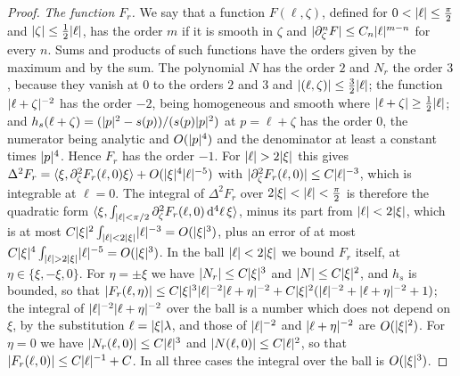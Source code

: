 \documentclass[11pt]{preprint}
\newcommand{\dd}{\mathrm{d}}
\DeclarePairedDelimiter{\abs}{\lvert}{\rvert}
\numberwithin{equation}{section}
\theoremstyle{definition}
\theoremstyle{remark}
\theoremstyle{plain}
\begin{document}
\begin{proof}
\emph{The function $F_r$.} We say that a function $F(\ell, \zeta)$, defined for $0 < \abs\ell \leq \frac\pi2$ and $\abs\zeta \leq \frac12\abs\ell$, has the order $m$ if it is smooth in $\zeta$ and $\abs{\partial_\zeta^nF} \leq C_n\abs\ell^{m-n}$ for every $n$. Sums and products of such functions have the orders given by the maximum and by the sum. The polynomial $N$ has the order $2$ and $N_r$ the order $3$, because they vanish at $0$ to the orders $2$ and $3$ and $\abs{(\ell, \zeta)} \leq \frac32\abs\ell$; the function $\abs{\ell + \zeta}^{-2}$ has the order $-2$, being homogeneous and smooth where $\abs{\ell + \zeta} \geq \frac12\abs\ell$; and $h_s(\ell + \zeta) = (\abs p^2 - s(p))/(s(p)\abs p^2)$ at $p = \ell + \zeta$ has the order $0$, the numerator being analytic and $O(\abs p^4)$ and the denominator at least a constant times $\abs p^4$. Hence $F_r$ has the order $-1$. For $\abs\ell > 2\abs\xi$ this gives $\Delta^2F_r = \langle\xi, \partial_\zeta^2F_r(\ell, 0)\xi\rangle + O(\abs\xi^4\abs\ell^{-5})$ with $\abs{\partial_\zeta^2F_r(\ell, 0)} \leq C\abs\ell^{-3}$, which is integrable at $\ell = 0$. The integral of $\Delta^2F_r$ over $2\abs\xi < \abs\ell < \frac\pi2$ is therefore the quadratic form $\langle\xi, \int_{\abs\ell<\pi/2}\partial_\zeta^2F_r(\ell, 0)\,\dd^4\ell\,\xi\rangle$, minus its part from $\abs\ell < 2\abs\xi$, which is at most $C\abs\xi^2\int_{\abs\ell<2\abs\xi}\abs\ell^{-3} = O(\abs\xi^3)$, plus an error of at most $C\abs\xi^4\int_{\abs\ell>2\abs\xi}\abs\ell^{-5} = O(\abs\xi^3)$. In the ball $\abs\ell < 2\abs\xi$ we bound $F_r$ itself, at $\eta \in \{ \xi, -\xi, 0 \}$. For $\eta = \pm\xi$ we have $\abs{N_r} \leq C\abs\xi^3$ and $\abs N \leq C\abs\xi^2$, and $h_s$ is bounded, so that $\abs{F_r(\ell, \eta)} \leq C\abs\xi^3\abs\ell^{-2}\abs{\ell + \eta}^{-2} + C\abs\xi^2(\abs\ell^{-2} + \abs{\ell + \eta}^{-2} + 1)$; the integral of $\abs\ell^{-2}\abs{\ell + \eta}^{-2}$ over the ball is a number which does not depend on $\xi$, by the substitution $\ell = \abs\xi\lambda$, and those of $\abs\ell^{-2}$ and $\abs{\ell + \eta}^{-2}$ are $O(\abs\xi^2)$. For $\eta = 0$ we have $\abs{N_r(\ell, 0)} \leq C\abs\ell^3$ and $\abs{N(\ell, 0)} \leq C\abs\ell^2$, so that $\abs{F_r(\ell, 0)} \leq C\abs\ell^{-1} + C$. In all three cases the integral over the ball is $O(\abs\xi^3)$.


\end{proof}
\end{document}
